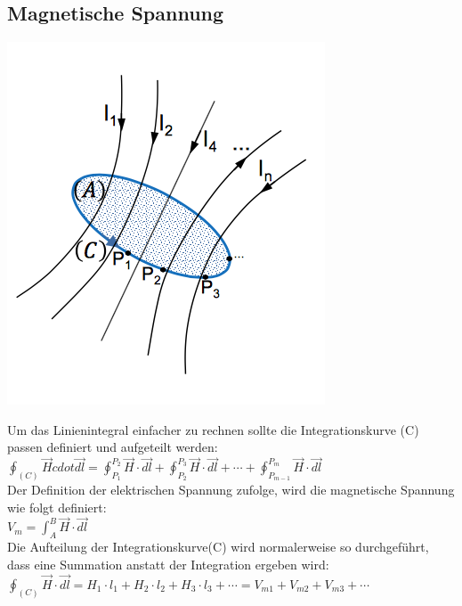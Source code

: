 \subsection{Magnetische Spannung}
\begin{minipage}{0.2 \linewidth}
    \includegraphics[width =\linewidth]{./Pics/VL2/magDurchflutung}
\end{minipage}
\begin{minipage}{0.8 \linewidth}
Um das Linienintegral einfacher zu rechnen sollte die Integrationskurve (C) passen definiert und aufgeteilt werden: \\

$\oint_{(C)} \vec{H} cdot \vec{dl} = \oint_{P_1}^{P_2} \vec{H} \cdot \vec{dl} + \oint_{P_2}^{P_3} \vec{H} \cdot \vec{dl}  + \cdots +\oint_{P_{m-1}}^{P_m} \vec{H} \cdot \vec{dl} $ \\

Der Definition der elektrischen Spannung zufolge, wird die magnetische Spannung wie folgt definiert: \\

$V_m = \int^B_A \vec{H} \cdot \vec{dl}$ \\

Die Aufteilung der Integrationskurve(C) wird normalerweise so durchgeführt, dass eine Summation anstatt der Integration ergeben wird: \\

$\oint_{(C)} \vec{H} \cdot \vec{dl} = H_1 \cdot l_1 + H_2 \cdot l_2 + H_3 \cdot l_3 + \cdots = V_{m1} + V_{m2} + V_{m3} + \cdots$
\end{minipage}

